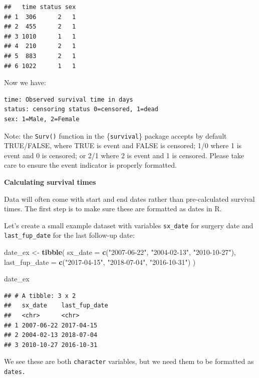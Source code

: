 \documentclass[
]{book}
\newenvironment{Shaded}{\begin{snugshade}}{\end{snugshade}}
\newcommand{\AttributeTok}[1]{\textcolor[rgb]{0.13,0.29,0.53}{#1}}
\newcommand{\FunctionTok}[1]{\textcolor[rgb]{0.13,0.29,0.53}{\textbf{#1}}}
\newcommand{\NormalTok}[1]{#1}
\newcommand{\OtherTok}[1]{\textcolor[rgb]{0.56,0.35,0.01}{#1}}
\newcommand{\StringTok}[1]{\textcolor[rgb]{0.31,0.60,0.02}{#1}}
\begin{document}
\begin{verbatim}
##   time status sex
## 1  306      2   1
## 2  455      2   1
## 3 1010      1   1
## 4  210      2   1
## 5  883      2   1
## 6 1022      1   1
\end{verbatim}

Now we have:

\begin{verbatim}
time: Observed survival time in days
status: censoring status 0=censored, 1=dead
sex: 1=Male, 2=Female
\end{verbatim}

Note: the \texttt{Surv()} function in the \{\texttt{survival}\} package accepts by default TRUE/FALSE, where TRUE is event and FALSE is censored; 1/0 where 1 is event and 0 is censored; or 2/1 where 2 is event and 1 is censored. Please take care to ensure the event indicator is properly formatted.

\textbf{Calculating survival times}

Data will often come with start and end dates rather than pre-calculated survival times. The first step is to make sure these are formatted as dates in R.

Let's create a small example dataset with variables \texttt{sx\_date} for surgery date and \texttt{last\_fup\_date} for the last follow-up date:

\begin{Shaded}
\begin{Highlighting}[]
\NormalTok{date\_ex }\OtherTok{\textless{}{-}} 
  \FunctionTok{tibble}\NormalTok{(}
    \AttributeTok{sx\_date =} \FunctionTok{c}\NormalTok{(}\StringTok{"2007{-}06{-}22"}\NormalTok{, }\StringTok{"2004{-}02{-}13"}\NormalTok{, }\StringTok{"2010{-}10{-}27"}\NormalTok{), }
    \AttributeTok{last\_fup\_date =} \FunctionTok{c}\NormalTok{(}\StringTok{"2017{-}04{-}15"}\NormalTok{, }\StringTok{"2018{-}07{-}04"}\NormalTok{, }\StringTok{"2016{-}10{-}31"}\NormalTok{)}
\NormalTok{    )}

\NormalTok{date\_ex}
\end{Highlighting}
\end{Shaded}

\begin{verbatim}
## # A tibble: 3 x 2
##   sx_date    last_fup_date
##   <chr>      <chr>        
## 1 2007-06-22 2017-04-15   
## 2 2004-02-13 2018-07-04   
## 3 2010-10-27 2016-10-31
\end{verbatim}

We see these are both \texttt{character} variables, but we need them to be formatted as \texttt{dates.}
\end{document}
